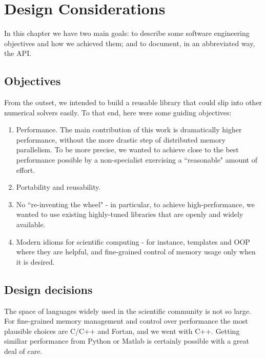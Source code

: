 \chapter{Design Considerations\label{chap:DesignConsiderations}}


In this chapter we have two main goals:  to describe some software engineering objectives and how we achieved them; and to document, in an abbreviated way, the API.


\section{Objectives}

From the outset, we intended to build a reusable library that could slip into other numerical solvers easily.  To that end, here were some guiding objectives: 
\begin{enumerate}
	\item Performance.  The main contribution of this work is dramatically higher performance, without the more drastic step of distributed memory parallelism.  To be more precise, we wanted to achieve close to the best performance possible by a non-specialist exercising a ``reasonable" amount of effort.
	\item Portability and reusability.
	\item No ``re-inventing the wheel" - in particular, to achieve high-performance, we wanted to use existing highly-tuned libraries that are openly and widely available.
	\item Modern idioms for scientific computing - for instance, templates and OOP where they are helpful, and fine-grained control of memory usage only when it is desired.
\end{enumerate}  
\section{Design decisions}
 The space of languages widely used in the scientific community is not so large. For fine-grained memory management and control over performance the most plausible choices are C/C++ and Fortan, and we went with C++.  Getting similiar performance from Python or Matlab is certainly possible with a great deal of care. 
 
